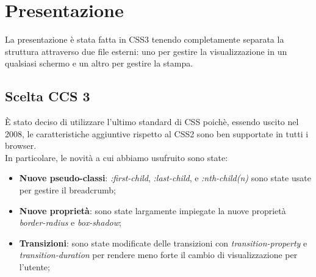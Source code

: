 \section{Presentazione}
	La presentazione è stata fatta in CSS3 tenendo completamente separata la struttura attraverso due file esterni: uno per gestire la visualizzazione in un qualsiasi schermo e un altro per gestire la stampa.
	\subsection{Scelta CCS 3}

	È stato deciso di utilizzare l'ultimo standard di CSS poichè, essendo uscito nel 2008, le  caratteristiche aggiuntive rispetto al CSS2 sono ben supportate in tutti i browser. \\ In particolare, le novità a cui abbiamo usufruito sono state:
	\begin{itemize}
		\item \textbf{Nuove pseudo-classi}: \emph{:first-child}, \emph{:last-child}, e \emph{:nth-child(n)} sono state usate per gestire il breadcrumb;
		\item \textbf{Nuove proprietà}: sono state largamente impiegate la nuove proprietà \emph{border-radius} e \emph{box-shadow};
		\item \textbf{Transizioni}: sono state modificate delle transizioni con \emph{transition-property} e \emph{transition-duration} per rendere meno forte il cambio di visualizzazione per l'utente;
	\end{itemize}
